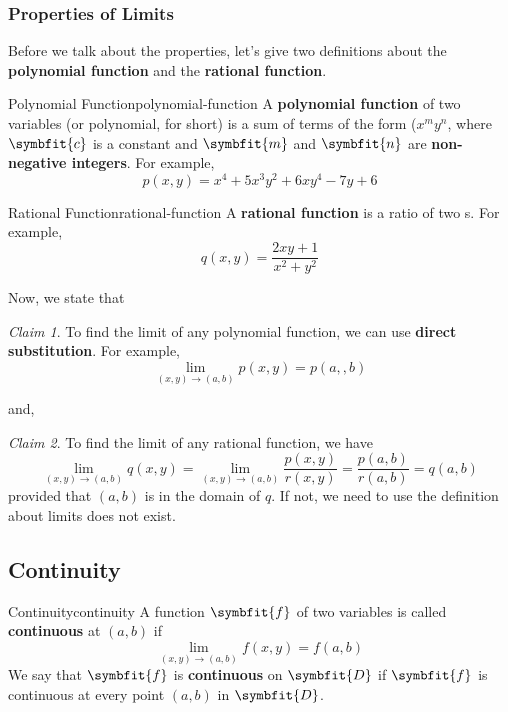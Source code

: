\documentclass[math,code]{amznotes}
\theoremstyle{remark}
\newtheorem*{claim}{Claim}
\begin{document}
\subsubsection{Properties of Limits}
Before we talk about the properties, let's give two definitions about the \textbf{polynomial function} and the \textbf{rational function}.
\begin{dfnbox}{Polynomial Function}{polynomial-function}
    A {\color{red} \textbf{polynomial function}} of two variables (or polynomial, for short) is a sum of terms of the form ($x^my^n$, where $\symbfit{c}$ is a constant and $\symbfit{m}$ and $\symbfit{n}$ are \textbf{non-negative integers}. For example,
    \begin{displaymath}
        p(x,y)=x^4+5x^3y^2+6xy^4-7y+6
    \end{displaymath}
\end{dfnbox}
\begin{dfnbox}{Rational Function}{rational-function}
    A {\color{red} \textbf{rational function}} is a ratio of two s. For example,
    \begin{displaymath}
        q(x,y)=\frac{2xy+1}{x^2+y^2}
    \end{displaymath}
\end{dfnbox}
Now, we state that
\begin{notebox}
    \begin{claim}
        To find the limit of any polynomial function, we can use \textbf{direct substitution}. For example,
        \begin{displaymath}
            \lim\limits_{(x,y) \to (a,b)} p(x,y) = p(a,,b)
        \end{displaymath}
    \end{claim}
\end{notebox}
and,
\begin{notebox}
    \begin{claim}
        To find the limit of any rational function, we have
        \begin{displaymath}
            \lim\limits_{(x,y) \to (a,b)} q(x,y) = \lim\limits_{(x,y) \to (a,b)} \frac{p(x,y)}{r(x,y)} = \frac{p(a,b)}{r(a,b)}=q(a,b)
        \end{displaymath}
        provided that $(a,b)$ is in the domain of $q$. If not, we need to use the definition about limits does not exist.
    \end{claim}
\end{notebox}
\subsection{Continuity}
\begin{dfnbox}{Continuity}{continuity}
    A function $\symbfit{f}$ of two variables is called {\color{red} \textbf{continuous}} at $(a,b)$ if
    \begin{displaymath}
        \lim\limits_{(x,y) \to (a,b)} f(x,y) = f(a,b)
    \end{displaymath}
    We say that $\symbfit{f}$ is {\color{red} \textbf{continuous}} on $\symbfit{D}$ if $\symbfit{f}$ is continuous at every point $(a,b)$ in $\symbfit{D}$.
\end{dfnbox}
\end{document}
